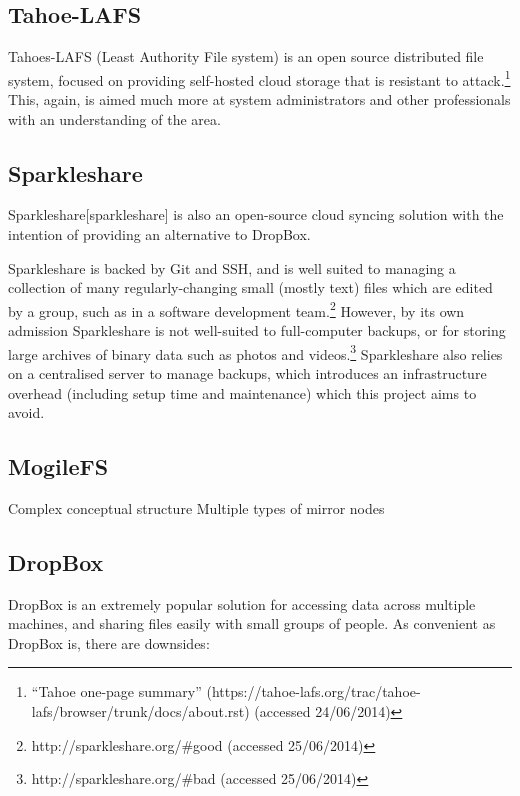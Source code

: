 \documentclass[12pt,a4paper,]{adreport}
\begin{document}
\subsection{Tahoe-LAFS}\label{tahoe-lafs}

Tahoes-LAFS (Least Authority File system) is an open source distributed
file system, focused on providing self-hosted cloud storage that is
resistant to attack.\footnote{``Tahoe one-page summary''
  (https://tahoe-lafs.org/trac/tahoe-lafs/browser/trunk/docs/about.rst)
  (accessed 24/06/2014)} This, again, is aimed much more at system
administrators and other professionals with an understanding of the
area.

\subsection{Sparkleshare}\label{sparkleshare}

Sparkleshare{[}sparkleshare{]} is also an open-source cloud syncing
solution with the intention of providing an alternative to DropBox.

Sparkleshare is backed by Git and SSH, and is well suited to managing a
collection of many regularly-changing small (mostly text) files which
are edited by a group, such as in a software development team.\footnote{http://sparkleshare.org/\#good
  (accessed 25/06/2014)} However, by its own admission Sparkleshare is
not well-suited to full-computer backups, or for storing large archives
of binary data such as photos and videos.\footnote{http://sparkleshare.org/\#bad
  (accessed 25/06/2014)} Sparkleshare also relies on a centralised
server to manage backups, which introduces an infrastructure overhead
(including setup time and maintenance) which this project aims to avoid.

\subsection{MogileFS}\label{mogilefs}

Complex conceptual structure Multiple types of mirror nodes

\subsection{DropBox}\label{dropbox}

DropBox is an extremely popular solution for accessing data across
multiple machines, and sharing files easily with small groups of people.
As convenient as DropBox is, there are downsides:
\end{document}
